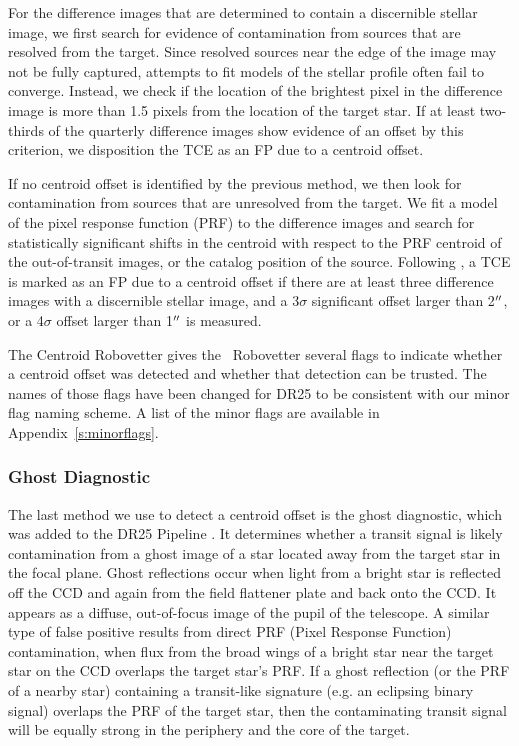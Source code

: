 For the difference images that are determined to contain a discernible stellar image, we first search for evidence of contamination from sources that are resolved from the target. Since resolved sources near the edge of the image may not be fully captured, attempts to fit models of the stellar profile often fail to converge. Instead, we check if the location of the brightest pixel in the difference image is more than 1.5 pixels from the location of the target star. If at least two-thirds of the quarterly difference images show evidence of an offset by this criterion, we disposition the TCE as an FP due to a centroid offset. 

If no centroid offset is identified by the previous method, we then look for contamination from sources that are unresolved from the target. We fit a model of the pixel response function (PRF) to the difference images and search for statistically significant shifts in the centroid with respect to the PRF centroid of the out-of-transit images, or the catalog position of the source. Following \citet{Bryson2013}, a TCE is marked as an FP due to a centroid offset if there are at least three difference images with a discernible stellar image, and a 3$\sigma$ significant offset larger than 2$\mbox{$^{\prime\prime}$}$, or a 4$\sigma$ offset larger than 1$\mbox{$^{\prime\prime}$}$ is measured.  

The Centroid Robovetter gives the \kepler\ Robovetter several flags to indicate whether a centroid offset was detected and whether that detection can be trusted. The names of those flags have been changed for DR25 to be consistent with our minor flag naming scheme. A list of the minor flags are available in Appendix~\ref{s:minorflags}.


\subsubsection{Ghost Diagnostic}
\label{s:ghost}
The last method we use to detect a centroid offset is the ghost diagnostic, which was added to the DR25 \kepler{} Pipeline \citep[see \S\,11.3.7 of][]{JenkinsKDPH}. It determines whether a transit signal is likely contamination from a ghost image of a star located away from the target star in the focal plane. Ghost reflections occur when light from a bright star is reflected off the CCD and again from the field flattener plate and back onto the CCD. It appears as a diffuse, out-of-focus image of the pupil of the telescope. A similar type of false positive results from direct PRF (Pixel Response Function) contamination, when flux from the broad wings of a bright star near the target star on the CCD overlaps the target star's PRF.  If a ghost reflection (or the PRF of a nearby star) containing a transit-like signature (e.g. an eclipsing binary signal) overlaps the PRF of the target star, then the contaminating transit signal will be equally strong in the periphery and the core of the target. 

